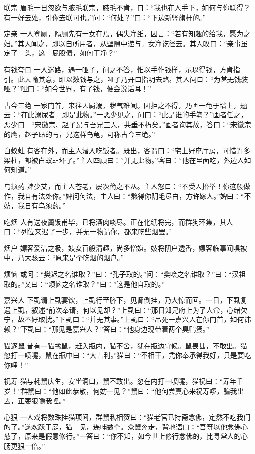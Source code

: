 \documentclass[12pt,UTF8]{ctexbook}
\begin{document}
联宗
眉毛一日忽欲与腋毛联宗，腋毛不肯，曰：“我也在人手下，如何与你联得？有一好去处，引你去联可也。”问：“何处？”曰：“下边新竖旗杆的。”

定亲
一人登厕，隔厕先有一女在焉，偶失净纸，因言：“若有知趣的给我，愿为之妇。”其人闻之，即以自所用者，从壁隙中递与。女净讫径去。其人叹曰：“亲事虽定了一头，这一屁股债，如何干净？”

有钱夸口
一人迷路，遇一哑子，问之不答，惟以手作钱样，示以得钱，方肯指引。此人喻其意，即以数钱与之，哑子乃开口指明去路。其人问曰：“为甚无钱装哑？”哑曰：“如今世界，有了钱，便会说话耳！”

古今三绝
一家门首，来往人屙溺，秽气难闻。因拒之不得，乃画一龟于墙上，题云：“在此溺尿者，即是此物。”一恶少见之，问曰：“此是谁的手笔？”画者任之，恶少曰：“宋徽宗、赵子昂与吾兄三人，共垂不朽矣。”画者询其故，答曰：“宋徽宗的鹰，赵子昂的马，兄这样乌龟，可称古今三绝。”

白蚁蛀
有客在外，而主人潜入吃饭者。既出，客谓曰：“宅上好座厅房，可惜许多梁柱，都被白蚁蛀坏了。”主人四顾曰：“并无此物。”客曰：“他在里面吃，外边人如何知道。”

乌须药
婢少艾，而主人苍老，屡次偷之不从。主人怒曰：“不受人抬举！你这般做作，我自有法处你。”婢问何法，主人曰：“熬得你阴毛尽白，方许嫁人。”婢曰：“不妨，我自有乌须药。”

吃烟
人有送夜羹饭甫毕，已将酒肉啖尽。正在化纸将完，而群狗环集，其人曰：“列位来迟了一步，并无一物请你，都来吃些烟罢。”

烟户
嫖客爱洁之极，妓女百般清趣，尚多憎嫌。妓将阴户透香，嫖客临事闻嗅被中，乃大骇云：“原来是个吃烟的烟户。”

烦恼
或问：“樊迟之名谁取？”曰：“孔子取的。”问：“樊哙之名谁取？”曰：“汉祖取的。”又曰：“烦恼之名谁取？”曰：”这是他自取的。”

嘉兴人
下虱请上虱宴饮，上虱行至脐下，见肾倒挂，乃大惊而回。一日，下虱复遇上虱，叙述“前次奉请，何以见却？”上虱曰：“那日知兄府上为了人命，心绪欠宁，故不好取扰。”下虱曰：“并无其事。”上虱曰：“吊死一嘉兴人在你门首，如何讳赖？”下虱曰：“那见是嘉兴人？”答曰：“他身边现带着两个臭鸭蛋。”

猫逐鼠
昔有一猫擒鼠，赶入瓶内，猫不舍，犹在瓶边守候。鼠畏甚，不敢出。猫忽打一喷嚏，鼠在瓶中曰：“大吉利。”猫曰：“不相干，凭你奉承得我好，只是要吃你哩！”

祝寿
猫与耗鼠庆生，安坐洞口，鼠不敢出。忽在内打一喷嚏，猫祝曰：“寿年千岁！”群鼠曰：“他如此恭敬，何妨一见？”鼠曰：“他何尝真心来祝寿啰，骗我出去，正要狠嚼我哩。”

心狠
一人戏将数珠挂猫项间，群鼠私相贺曰：“猫老官已持斋念佛，定然不吃我们的了。”遂欢跃于庭，猫一见，连哺数个。众鼠奔走，背地语曰：“吾等以他念佛心慈了，原来是假意修行。”一答曰：“你不知，如今世上修行念佛的，比寻常人的心肠更狠十倍。”
\end{document}
